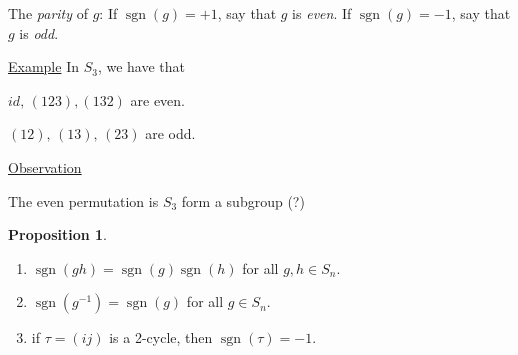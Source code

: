 \documentclass{article}
\theoremstyle{definition}
\newtheorem{proposition}{Proposition}
\DeclareMathOperator{\sgn}{sgn}
\begin{document}
The \emph{parity} of $g$: If $\sgn(g)=+1$, say that $g$ is \emph{even}.
If $\sgn(g)=-1$, say that $g$ is \emph{odd}.

\underline{Example}
In $S_3$, we have that 

$id,\,(1 2 3), (1 3 2)$ are even.

$(1 2),\, (1 3),\,(2 3)$ are odd.

\underline{Observation}

The even permutation is $S_3$ form a subgroup (?)

\begin{proposition}
  \label{prp:sgn}
  \begin{enumerate}
    \item $\sgn(gh)=\sgn(g)\sgn(h)$ for all $g,h \in S_n$.
    \item $\sgn(g^{-1})=\sgn(g)$ for all $g \in S_n$.
    \item if $\tau=(i j)$ is a 2-cycle, then $\sgn(\tau)=-1$.
  \end{enumerate}
\end{proposition}
\end{document}
